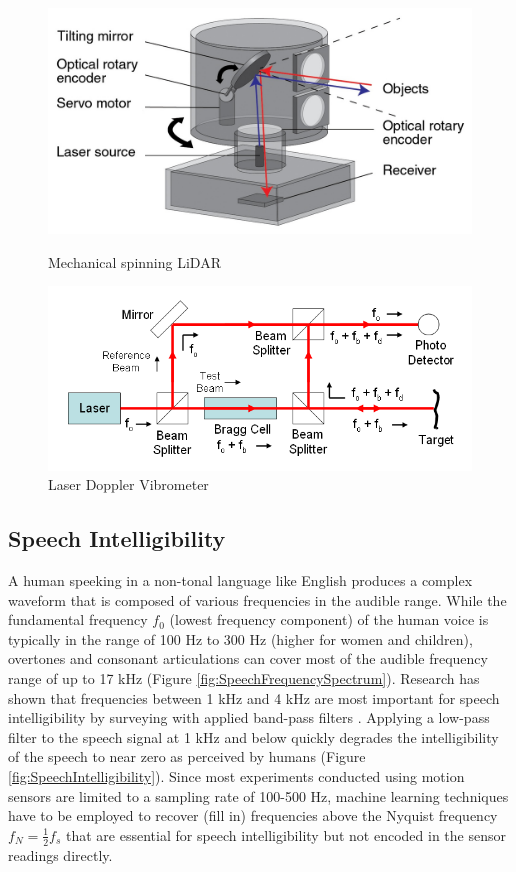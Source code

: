 \documentclass[sigconf, nonacm]{acmart}
\begin{document}
\begin{figure}[H]
  \centering
  \includegraphics[width=\linewidth]{embed/Lidar_scanner.jpg}
  \caption{Mechanical spinning LiDAR \cite{RenishawLidar}}
  \label{fig:LiDAR}

  \vspace{0.5cm}

  \includegraphics[width=\linewidth]{embed/Laser_Doppler_Vibrometer.png}
  \caption{Laser Doppler Vibrometer \cite{WikipediaLDV}}
  \label{fig:LDV}
\end{figure}

\subsection{Speech Intelligibility}
A human speeking in a non-tonal language like English produces a complex waveform that is composed of various frequencies in the audible range.
While the fundamental frequency $f_0$ (lowest frequency component) of the human voice is typically in the range of 100 Hz to 300 Hz (higher for women and children), overtones and consonant articulations can cover most of the audible frequency range of up to 17 kHz (Figure \ref{fig:SpeechFrequencySpectrum}).
Research has shown that frequencies between 1 kHz and 4 kHz are most important for speech intelligibility by surveying with applied band-pass filters \cite{DPAMicrophonesFactsAboutSpeechIntelligibility}.
Applying a low-pass filter to the speech signal at 1 kHz and below quickly degrades the intelligibility of the speech to near zero as perceived by humans (Figure \ref{fig:SpeechIntelligibility}).
Since most experiments conducted using motion sensors are limited to a sampling rate of 100-500 Hz, machine learning techniques have to be employed to recover (fill in) frequencies above the Nyquist frequency $f_N = \frac{1}{2}f_s$ that are essential for speech intelligibility but not encoded in the sensor readings directly.
\end{document}
